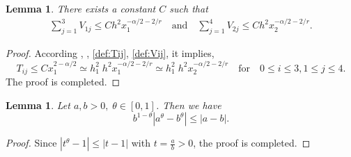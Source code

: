 \documentclass{amsart}
\newtheorem{lemma}[theorem]{Lemma}
\theoremstyle{definition}
\theoremstyle{remark}
\numberwithin{equation}{section}
\begin{document}
\begin{lemma} \label{lmm:sumSij13}
  There exists a constant $C$ such that
  \begin{gather*}
    \sum_{j=1}^{3} V_{1j} \le C h^2 x_1^{-\alpha/2-2/r}  \quad \text{and} \quad
    \sum_{j=1}^{4} V_{2j} \le C h^2 x_2^{-\alpha/2-2/r}  .
  \end{gather*}
\end{lemma}
\begin{proof}
  According , , \eqref{def:Tij}, \eqref{def:Vij}, it implies, 
  \begin{equation*}
    T_{ij} \le C x_1^{2-\alpha/2} \simeq h_1^2 \; h^2 x_1^{-\alpha/2-2/r} \simeq h_1^2 \; h^2 x_2^{-\alpha/2-2/r} \quad \text{for}\quad 0\le i \le 3, 1\le j \le 4.
  \end{equation*}
  The proof is completed.
\end{proof}

\begin{lemma} \label{ineq:a-b-theta}
Let $a,b> 0,\; \theta \in [0,1]$. Then we have
  \begin{equation*}
    b^{1-\theta}|a^{\theta}-b^{\theta}| \le |a-b|. %
  \end{equation*}
\end{lemma}
\begin{proof}
    Since $|t^\theta - 1| \le |t-1|$ with $t=\frac{a}{b} > 0$, the proof is completed.
\end{proof}
\end{document}
